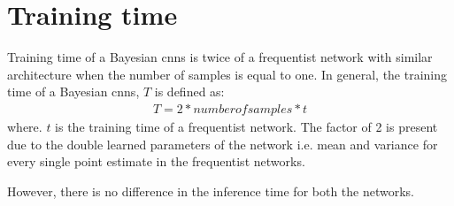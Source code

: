 \section{Training time}

Training time of a Bayesian \acp{cnn} is twice of a frequentist network with similar architecture when the number of samples is equal to one. In general, the training time of a Bayesian \acp{cnn}, $T$ is defined as:
\begin{align}
T = 2 * number of samples * t
\end{align}
where. $t$ is the training time of a frequentist network. 
The factor of 2 is present due to the double learned parameters of the network i.e. mean and variance for every single point estimate in the frequentist networks.

However, there is no difference in the inference time for both the networks. 


\ifpdf
    \graphicspath{{Chapter2/Figs/Raster/}{Chapter2/Figs/PDF/}{Chapter2/Figs/}}
\else
    \graphicspath{{Chapter2/Figs/Vector/}{Chapter2/Figs/}}
\fi


